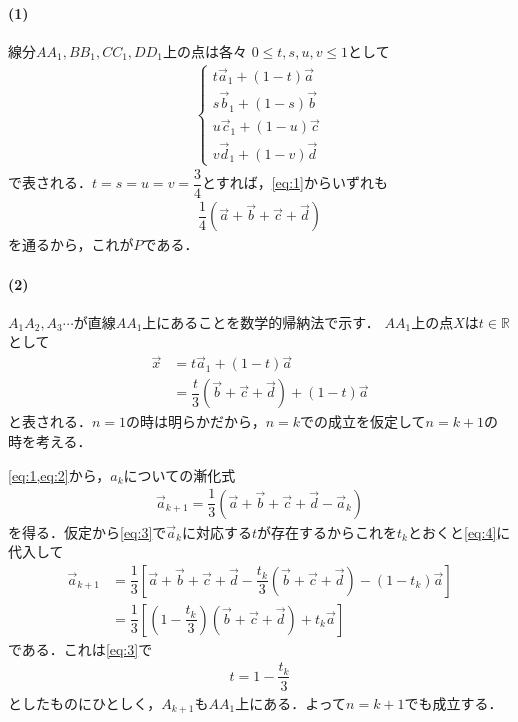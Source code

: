 \documentclass[../../main.tex]{subfiles}
\begin{document}
\paragraph{(1)}

線分$AA_1, BB_1, CC_1, DD_1$上の点は各々 $0 \le t, s, u, v \le 1$として
\begin{align}
  \begin{cases}
    t \vec{a}_1 + (1-t) \vec{a} \\
    s \vec{b}_1 + (1-s) \vec{b} \\
    u \vec{c}_1 + (1-u) \vec{c} \\
    v \vec{d}_1 + (1-v) \vec{d}
  \end{cases}
\end{align}
で表される．$t=s=u=v=\dfrac{3}{4}$とすれば，\cref{eq:1}からいずれも
\begin{align}
  \dfrac{1}{4} (\vec{a} + \vec{b} + \vec{c} + \vec{d})
\end{align}
を通るから，これが$P$である．

\paragraph{(2)}

$A_1 A_2, A_3 \cdots$が直線$AA_1$上にあることを数学的帰納法で示す．
$AA_1$上の点$X$は$t \in \mathbb{R}$として
\begin{align}
  \vec{x}
  & = t\vec{a}_1 + (1-t)\vec{a} \\
  & = \dfrac{t}{3} (\vec{b} + \vec{c} + \vec{d}) + (1-t) \vec{a} \label{eq:3}
\end{align}
と表される．$n=1$の時は明らかだから，$n=k$での成立を仮定して$n=k+1$の時を考える．

\cref{eq:1,eq:2}から，$a_k$についての漸化式
\begin{align}
  \vec{a}_{k+1} = \dfrac{1}{3} (\vec{a} + \vec{b} + \vec{c} + \vec{d} - \vec{a}_k) \label{eq:4}
\end{align}
を得る．仮定から\cref{eq:3}で$\vec{a}_k$に対応する$t$が存在するからこれを$t_k$とおくと\cref{eq:4}に代入して
\begin{align}
  \vec{a}_{k+1}
  &= \dfrac{1}{3} \left[ \vec{a} + \vec{b} + \vec{c} + \vec{d} - \dfrac{t_k}{3} (\vec{b} + \vec{c} + \vec{d}) - (1-t_k) \vec{a} \right] \\
  &= \dfrac{1}{3} \left[ \left(1-\dfrac{t_k}{3}\right) (\vec{b} + \vec{c} + \vec{d}) + t_k \vec{a} \right]
\end{align}
である．これは\cref{eq:3}で
\begin{align}
  t = 1 - \dfrac{t_k}{3} \label{eq:5}
\end{align}
としたものにひとしく，$A_{k+1}$も$AA_1$上にある．よって$n=k+1$でも成立する．
\end{document}
